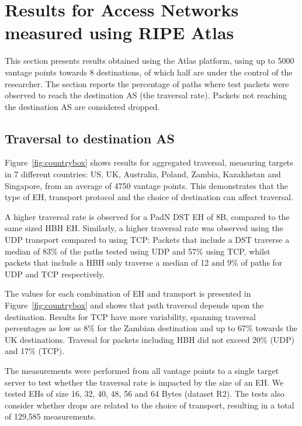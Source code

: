 \documentclass[conference]{IEEEtran}
\begin{document}
\section{Results for Access Networks measured using RIPE Atlas} 
\label{sec:ripe-results}

This section presents results obtained using the Atlas platform, using up to 5000 vantage points towards 8 destinations, of which half are under the control of the researcher. The section reports the percentage of paths where test packets were observed to reach the destination AS (the traversal rate). Packets not reaching the destination AS are considered dropped. 

\subsection{Traversal to destination AS}

Figure~\ref{fig:countrybox} shows results for aggregated traversal, measuring targets in 7 different countries: US, UK, Australia, Poland, Zambia, Kazakhstan and Singapore, from an average of 4750 vantage points. This demonstrates that the type of EH, transport protocol and the choice of destination can affect traversal.

A higher traversal rate is observed for a PadN DST EH of 8B, compared to the same sized HBH EH. Similarly, a higher traversal rate was observed using the UDP transport compared to using TCP: Packets that include a DST traverse a median of 83\% of the paths tested using UDP and 57\% using TCP, whilst packets that include a HBH only traverse a median of 12 and 9\% of paths for UDP and TCP respectively.

The values for each combination of EH and transport is presented in Figure~\ref{fig:countrybox} and shows that path traversal depends upon the destination. Results for TCP have more variability, spanning traversal percentages as low as 8\% for the Zambian destination and up to 67\% towards the UK destinations. Travesal for packets including HBH did not exceed 20\% (UDP) and 17\% (TCP).

The measurements were performed from all vantage points to a single target server to test whether the traversal rate is impacted by the size of an EH. We tested EHs of size 16, 32, 40, 48, 56 and 64 Bytes (dataset R2). The tests also consider whether drops are related to the choice of transport, resulting in a total of 129,585 measurements.
 
\end{document}
